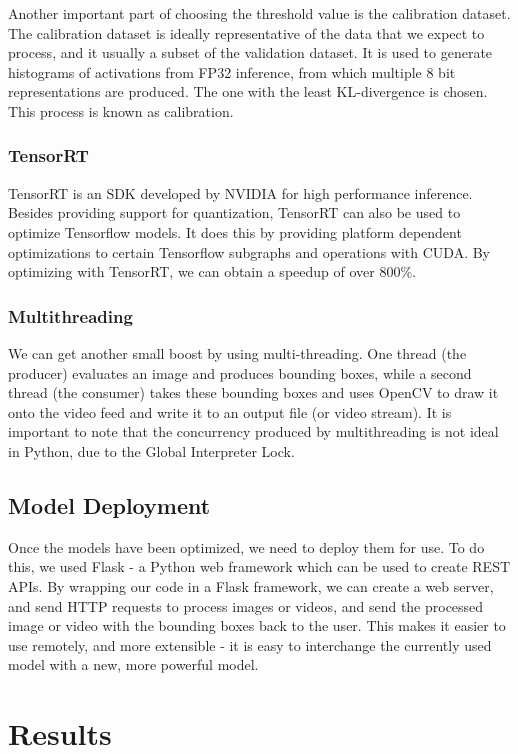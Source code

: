 \documentclass[12pt,letterpaper]{article}
\begin{document}
Another important part of choosing the threshold value is the calibration dataset. The calibration dataset is ideally representative of the data that we expect to process, and it usually a subset of the validation dataset. It is used to generate histograms of activations from FP32 inference, from which multiple 8 bit representations are produced. The one with the least KL-divergence is chosen. This process is known as calibration.

\subsubsection{TensorRT}

TensorRT is an SDK developed by NVIDIA for high performance inference. Besides providing support for quantization, TensorRT can also be used to optimize Tensorflow models. It does this by providing platform dependent optimizations to certain Tensorflow subgraphs and operations with CUDA. By optimizing with TensorRT, we can obtain a speedup of over 800\%.

\subsubsection{Multithreading}

We can get another small boost by using multi-threading. One thread (the producer) evaluates an image and produces bounding boxes, while a second thread (the consumer) takes these bounding boxes and uses OpenCV to draw it onto the video feed and write it to an output file (or video stream). It is important to note that the concurrency produced by multithreading is not ideal in Python, due to the Global Interpreter Lock.

\subsection{Model Deployment}

Once the models have been optimized, we need to deploy them for use. To do this, we used Flask - a Python web framework which can be used to create REST APIs. By wrapping our code in a Flask framework, we can create a web server, and send HTTP requests to process images or videos, and send the processed image or video with the bounding boxes back to the user. This makes it easier to use remotely, and more extensible - it is easy to interchange the currently used model with a new, more powerful model.

\section{Results}
\end{document}
